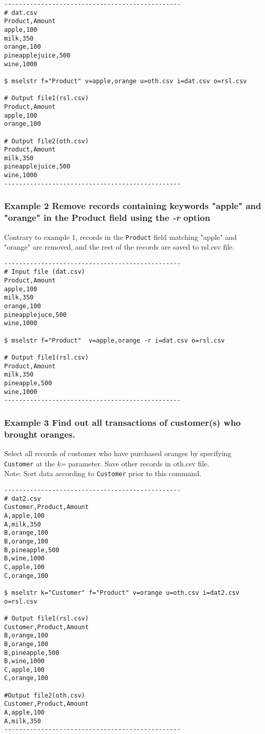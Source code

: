 \documentclass[a4paper]{jarticle}
\begin{document}
\begin{verbatim}
------------------------------------------------
# dat.csv
Product,Amount
apple,100
milk,350
orange,100
pineapplejuice,500
wine,1000

$ mselstr f="Product" v=apple,orange u=oth.csv i=dat.csv o=rsl.csv

# Output file1(rsl.csv)
Product,Amount
apple,100
orange,100

# Output file2(oth.csv)
Product,Amount
milk,350
pineapplejuice,500
wine,1000
------------------------------------------------
\end{verbatim}

\subsubsection*{Example 2 Remove records containing keywords "apple" and "orange" in the Product field using the \emph{-r} option}
Contrary to example 1, records in the \verb|Product| field matching "apple" and "orange" are removed, and the rest of the records are saved to rsl.csv file. 

\begin{verbatim}
------------------------------------------------
# Input file (dat.csv)
Product,Amount
apple,100
milk,350
orange,100
pineapplejuce,500
wine,1000

$ mselstr f="Product"  v=apple,orange -r i=dat.csv o=rsl.csv

# Output file1(rsl.csv)
Product,Amount
milk,350
pineapple,500
wine,1000
------------------------------------------------
\end{verbatim}

\subsubsection*{Example 3 Find out all transactions of customer(s) who brought oranges. }
Select all records of customer who have purchased oranges by specifying \verb|Customer| at the \emph{k=} parameter. Save other records in oth.csv file. 
\\Note: Sort data according to \verb|Customer| prior to this command. 

\begin{verbatim}
------------------------------------------------
# dat2.csv
Customer,Product,Amount
A,apple,100
A,milk,350
B,orange,100
B,orange,100
B,pineapple,500
B,wine,1000
C,apple,100
C,orange,100

$ mselstr k="Customer" f="Product" v=orange u=oth.csv i=dat2.csv o=rsl.csv

# Output file1(rsl.csv)
Customer,Product,Amount
B,orange,100
B,orange,100
B,pineapple,500
B,wine,1000
C,apple,100
C,orange,100

#Output file2(oth.csv)
Customer,Product,Amount
A,apple,100
A,milk,350
------------------------------------------------
\end{verbatim}
\end{document}
